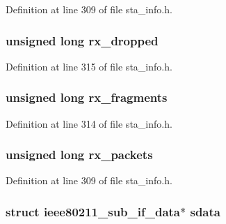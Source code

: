 Definition at line 309 of file sta\-\_\-info.\-h.

\hypertarget{structsta__info_ac3653bc0393e5b307149b410d204ff5a}{
\subsubsection[{rx\-\_\-dropped}]{\setlength{\rightskip}{0pt plus 5cm}unsigned long rx\-\_\-dropped}}\label{structsta__info_ac3653bc0393e5b307149b410d204ff5a}


Definition at line 315 of file sta\-\_\-info.\-h.

\hypertarget{structsta__info_a5ac9d5a701fcf1a16343d0de95856e24}{
\subsubsection[{rx\-\_\-fragments}]{\setlength{\rightskip}{0pt plus 5cm}unsigned long rx\-\_\-fragments}}\label{structsta__info_a5ac9d5a701fcf1a16343d0de95856e24}


Definition at line 314 of file sta\-\_\-info.\-h.

\hypertarget{structsta__info_a056e6ed90717e599b8ee70649fcd14b0}{
\subsubsection[{rx\-\_\-packets}]{\setlength{\rightskip}{0pt plus 5cm}unsigned long rx\-\_\-packets}}\label{structsta__info_a056e6ed90717e599b8ee70649fcd14b0}


Definition at line 309 of file sta\-\_\-info.\-h.

\hypertarget{structsta__info_ad829d8d33f06a7245cc303f924f259ac}{
\subsubsection[{sdata}]{\setlength{\rightskip}{0pt plus 5cm}struct {\bf ieee80211\-\_\-sub\-\_\-if\-\_\-data}$\ast$ sdata}}\label{structsta__info_ad829d8d33f06a7245cc303f924f259ac}


